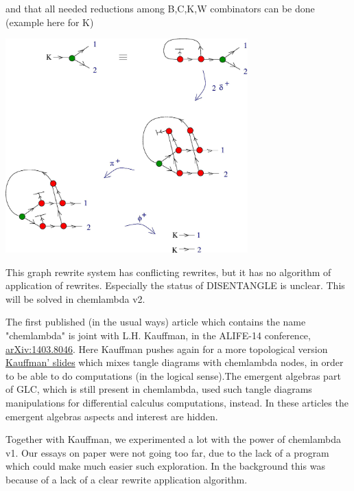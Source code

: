 \documentclass{article}
\begin{document}
and that all needed reductions among B,C,K,W combinators can be done (example here for K)



\vspace{.5cm}
 
\centerline{\includegraphics[width=0.7\textwidth]{../img/chemical-concrete-machine/bckw_6.jpg}
}
\vspace{.5cm}

This graph rewrite system has conflicting rewrites, but it has no algorithm of application of rewrites. Especially the status of DISENTANGLE is unclear. This will be solved in chemlambda v2.



The first published (in the usual ways) article which contains the name "chemlambda" is joint with L.H. Kauffman, in the ALIFE-14 conference, \href{https://arxiv.org/abs/1403.8046}{arXiv:1403.8046}. Here Kauffman pushes again for a more topological version \href{https://mbuliga.github.io/emergent-10-years/pdf/ALIFETalk-copy.pdf}{Kauffman'  slides} \cite{kauffmanslides} which mixes tangle diagrams with chemlambda nodes, in order to be able to do computations (in the logical sense).The emergent algebras part of GLC, which is still present in chemlambda, used such tangle diagrams manipulations for differential calculus computations, instead. In these articles the emergent algebras aspects and interest are hidden. 



Together with Kauffman, we experimented a lot with the power of chemlambda v1. Our essays on paper were not going too far, due to the lack of a program which could make much easier such exploration. In the background this was because of a lack of a clear rewrite application algorithm. 
\end{document}
